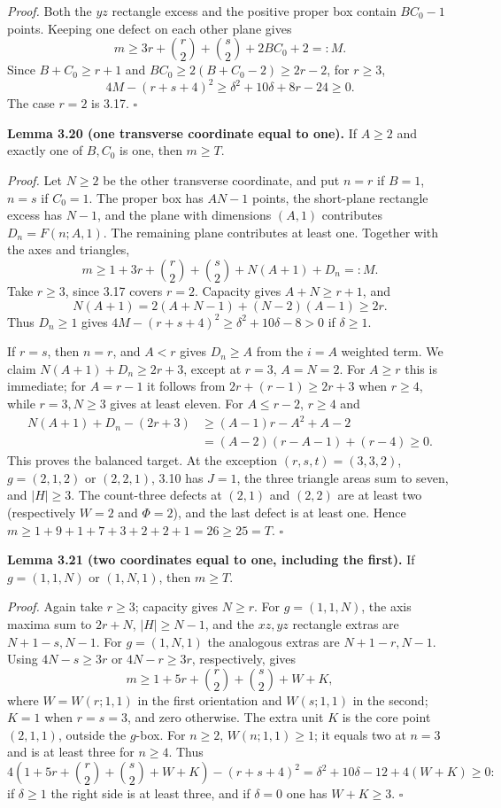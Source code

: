 \documentclass[11pt]{article}
\begin{document}
\emph{Proof.}
Both the $yz$ rectangle excess and the positive proper box contain
$BC_0-1$ points.  Keeping one defect on each other plane gives
\[
 m\ge3r+\binom r2+\binom s2+2BC_0+2=:M.
\]
Since $B+C_0\ge r+1$ and
$BC_0\ge2(B+C_0-2)\ge2r-2$, for $r\ge3$,
\[
 4M-(r+s+4)^2\ge\delta^2+10\delta+8r-24\ge0.
\]
The case $r=2$ is 3.17. \ensuremath{\square}

\label{res:A12.5}
\textbf{Lemma 3.20 (one transverse coordinate equal to one).}
If $A\ge2$ and exactly one of $B,C_0$ is one, then $m\ge T$.

\emph{Proof.}
Let $N\ge2$ be the other transverse coordinate, and put $n=r$ if
$B=1$, $n=s$ if $C_0=1$.  The proper box has $AN-1$ points,
the short-plane rectangle excess has $N-1$, and the plane with
dimensions $(A,1)$ contributes $D_n=F(n;A,1)$.  The remaining plane
contributes at least one.  Together with the axes and triangles,
\[
 m\ge1+3r+\binom r2+\binom s2+N(A+1)+D_n=:M.\tag{3.11}
\]
Take $r\ge3$, since 3.17 covers $r=2$.
Capacity gives $A+N\ge r+1$, and
\[
 N(A+1)=2(A+N-1)+(N-2)(A-1)\ge2r.
\]
Thus $D_n\ge1$ gives
$4M-(r+s+4)^2\ge\delta^2+10\delta-8>0$ if $\delta\ge1$.

If $r=s$, then $n=r$, and $A<r$ gives $D_n\ge A$ from the $i=A$
weighted term.  We claim $N(A+1)+D_n\ge2r+3$, except at $r=3$,
$A=N=2$.  For $A\ge r$ this is immediate; for $A=r-1$ it follows
from $2r+(r-1)\ge2r+3$ when $r\ge4$, while $r=3,N\ge3$ gives
at least eleven.  For $A\le r-2$, $r\ge4$ and
\[
\begin{split}
 N(A+1)+D_n-(2r+3)
 &\ge(A-1)r-A^2+A-2\\
 &=(A-2)(r-A-1)+(r-4)\ge0.
\end{split}
\]
This proves the balanced target.  At the exception
$(r,s,t)=(3,3,2)$, $g=(2,1,2)$ or $(2,2,1)$, 3.10 has $J=1$,
the three triangle areas sum to seven, and $|H|\ge3$.
The count-three defects at $(2,1)$ and $(2,2)$ are at least two
(respectively $W=2$ and $\Phi=2$), and the last defect is at least one.
Hence $m\ge1+9+1+7+3+2+2+1=26\ge25=T$.
\ensuremath{\square}

\label{res:A12.6}
\textbf{Lemma 3.21 (two coordinates equal to one, including the first).}
If $g=(1,1,N)$ or $(1,N,1)$, then $m\ge T$.

\emph{Proof.}
Again take $r\ge3$; capacity gives $N\ge r$.
For $g=(1,1,N)$, the axis maxima sum to $2r+N$,
$|H|\ge N-1$, and the $xz,yz$ rectangle extras are
$N+1-s,N-1$.  For $g=(1,N,1)$ the analogous extras are
$N+1-r,N-1$.  Using $4N-s\ge3r$ or $4N-r\ge3r$, respectively,
gives
\[
 m\ge1+5r+\binom r2+\binom s2+W+K,\tag{3.12}
\]
where $W=W(r;1,1)$ in the first orientation and $W(s;1,1)$ in the
second; $K=1$ when $r=s=3$, and zero otherwise.
The extra unit $K$ is the core point $(2,1,1)$, outside the $g$-box.
For $n\ge2$, $W(n;1,1)\ge1$; it equals two at $n=3$ and is at least
three for $n\ge4$.  Thus
\[
 4\left(1+5r+\binom r2+\binom s2+W+K\right)-(r+s+4)^2
 =\delta^2+10\delta-12+4(W+K)\ge0:
\]
if $\delta\ge1$ the right side is at least three, and if $\delta=0$
one has $W+K\ge3$. \ensuremath{\square}
\end{document}
